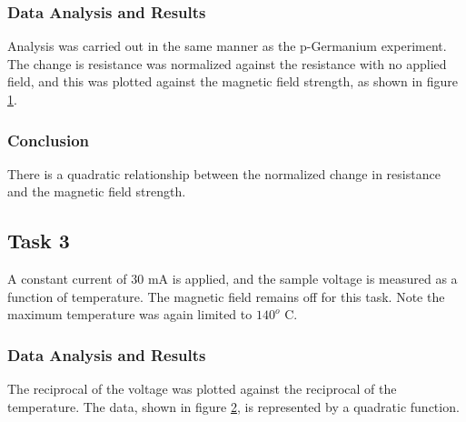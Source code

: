 \documentclass[a4paper]{article}
\begin{document}
\subsubsection{Data Analysis and Results}
\qq Analysis was carried out in the same manner as the p-Germanium
experiment. The change is resistance was normalized against the
resistance with no applied field, and this was plotted against the
magnetic field strength, as shown in figure \ref{task32plot}.

\begin{figure}[H]
\centering
\label{task32plot}
\end{figure}


\subsubsection{Conclusion}
\qq There is a quadratic relationship between the normalized change in
resistance and the magnetic field strength.

\subsection{Task 3}
\qq A constant current of 30 mA is applied, and the sample voltage is
 measured as a function of temperature. The magnetic field remains off
 for this task. Note the maximum temperature was again limited to
 $140^o$ C.

\subsubsection{Data Analysis and Results}
\qq The reciprocal of the voltage was plotted against the reciprocal
of the temperature. The data, shown in figure \ref{task33plot}, is
represented by a quadratic function.

\begin{figure}[H]
\centering
\label{task33plot}
\end{figure}
\end{document}
